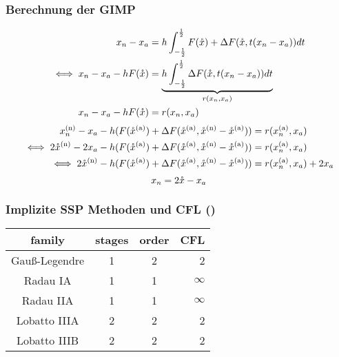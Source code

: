 \begin{frame}[<+->]
\frametitle{Berechnung der GIMP}
\begin{align}
x_n - x_a &= h \int_{-\frac{1}{2}}^{\frac{1}{2}} F(\mathring{x}) + \Delta F(\mathring{x},t(x_n-x_a))dt\\
\iff x_n - x_a -h F(\mathring{x})&= \underbrace{h \int_{-\frac{1}{2}}^{\frac{1}{2}} \Delta F(\mathring{x},t(x_n-x_a))dt}_{r(x_n,x_a)}\\
x_n - x_a -h F(\mathring{x}) &= r(x_n,x_a)
\end{align}
\begin{align}
  x_n^{\text{(n)}} - x_a - h (F(\mathring{x}^{\text{(a)}}) +\Delta F(\mathring{x}^{\text{(a)}},\mathring{x}^{\text{(n)}} - \mathring{x}^{\text{(a)}})) &= r(x_n^{\text{(a)}},x_a)\\
 \iff 2\mathring{x}^{\text{(n)}} - 2x_a - h (F(\mathring{x}^{\text{(a)}}) +\Delta F(\mathring{x}^{\text{(a)}},\mathring{x}^{\text{(n)}} - \mathring{x}^{\text{(a)}})) &= r(x_n^{\text{(a)}},x_a)\\
 \iff  2\mathring{x}^{\text{(n)}} -  h (F(\mathring{x}^{\text{(a)}}) +\Delta F(\mathring{x}^{\text{(a)}},\mathring{x}^{\text{(n)}} - \mathring{x}^{\text{(a)}})) &= r(x_n^{\text{(a)}},x_a) + 2x_a
\end{align}
\[x_n = 2\mathring{x} - x_a\]
\end{frame}

\begin{frame}
 \frametitle{Implizite SSP Methoden und CFL (\cite{ketcheson2009optimal})}
 \centering
\begin{tabular*}{0.75\textwidth}{  c | c | c | r  }
\hline 
family & stages & order & CFL \\ 
\hline 
Gauß-Legendre & 1 & 2 & 2 \\
\hline 
Radau IA& 1 & 1 & $\infty$ \\
\hline 
Radau IIA & 1 & 1 & $\infty$ \\
\hline 
Lobatto IIIA & 2 & 2 & 2 \\
\hline 
Lobatto IIIB & 2 & 2 & 2 \\
\hline 
\end{tabular*}
\end{frame}

